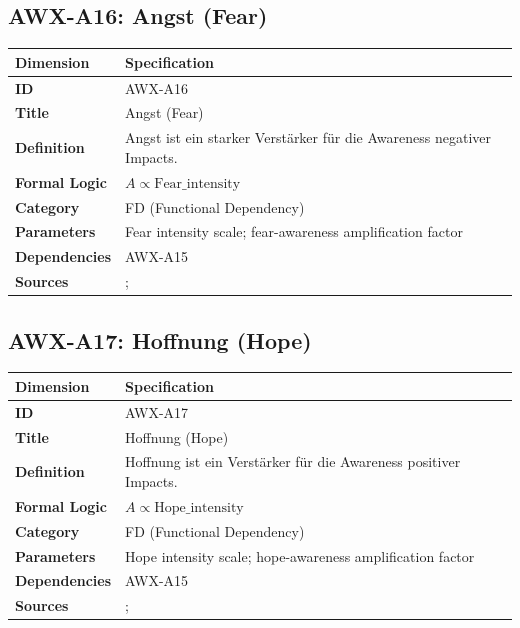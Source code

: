
\subsection{AWX-A16: Angst (Fear)}

\begin{table}[htbp]
\small
\begin{tabular}{p{3cm}p{11cm}}
\toprule
\textbf{Dimension} & \textbf{Specification} \\
\midrule
\textbf{ID} & AWX-A16 \\
\textbf{Title} & Angst (Fear) \\
\textbf{Definition} & Angst ist ein starker Verstärker für die Awareness negativer Impacts. \\
\textbf{Formal Logic} & $A \propto \text{Fear\_intensity}$ \\
\textbf{Category} & FD (Functional Dependency) \\
\textbf{Parameters} & Fear intensity scale; fear-awareness amplification factor \\
\textbf{Dependencies} & AWX-A15 \\
\textbf{Sources} & \citet{loewenstein2001risk}; \citet{slovic2004risk} \\
\bottomrule
\end{tabular}
\end{table}


\subsection{AWX-A17: Hoffnung (Hope)}

\begin{table}[htbp]
\small
\begin{tabular}{p{3cm}p{11cm}}
\toprule
\textbf{Dimension} & \textbf{Specification} \\
\midrule
\textbf{ID} & AWX-A17 \\
\textbf{Title} & Hoffnung (Hope) \\
\textbf{Definition} & Hoffnung ist ein Verstärker für die Awareness positiver Impacts. \\
\textbf{Formal Logic} & $A \propto \text{Hope\_intensity}$ \\
\textbf{Category} & FD (Functional Dependency) \\
\textbf{Parameters} & Hope intensity scale; hope-awareness amplification factor \\
\textbf{Dependencies} & AWX-A15 \\
\textbf{Sources} & \citet{snyder2002hope}; \citet{rottenstreich2001money} \\
\bottomrule
\end{tabular}
\end{table}


